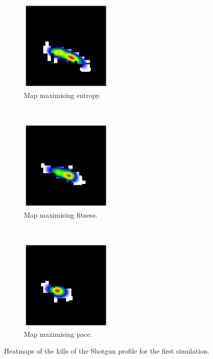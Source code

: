 \begin{figure}[H]
    \centering
    \begin{subfigure}[t]{0.3\textwidth}
        \centering
        \includegraphics[height=4.5cm]{Images/images/experiment_two/best_entropy_pop_0/kills_bot_0.png}
        \caption{Map maximising entropy.}
    \end{subfigure}%
    ~ 
    \begin{subfigure}[t]{0.3\textwidth}
        \centering
        \includegraphics[height=4.5cm]{Images/images/experiment_two/best_fitness_pop_0/kills_bot_0.png}
        \caption{Map maximising fitness.}
    \end{subfigure}
    ~ 
    \begin{subfigure}[t]{0.3\textwidth}
        \centering
        \includegraphics[height=4.5cm]{Images/images/experiment_two/best_pace_pop_0/kills_bot_0.png}
        \caption{Map maximising pace.}
    \end{subfigure}
    \caption{Heatmaps of the kills of the Shotgun profile for the first simulation.}
\end{figure}
